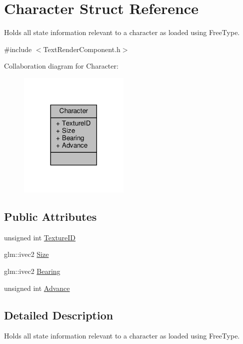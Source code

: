 \hypertarget{structCharacter}{}\section{Character Struct Reference}
\label{structCharacter}


Holds all state information relevant to a character as loaded using Free\+Type.  




{\ttfamily \#include $<$Text\+Render\+Component.\+h$>$}



Collaboration diagram for Character\+:
\nopagebreak
\begin{figure}[H]
\begin{center}
\leavevmode
\includegraphics[width=149pt]{structCharacter__coll__graph}
\end{center}
\end{figure}
\subsection*{Public Attributes}
\begin{DoxyCompactItemize}
\item 
unsigned int \hyperlink{structCharacter_a411760a6a33f2cb54dd6a0138e038a46}{Texture\+ID}
\item 
glm\+::ivec2 \hyperlink{structCharacter_aaaa598050e0ef590fe6903fd2bab40b8}{Size}
\item 
glm\+::ivec2 \hyperlink{structCharacter_afef98bf9c7f5313d96476f6f3f85f872}{Bearing}
\item 
unsigned int \hyperlink{structCharacter_a5338c0800545802a63f8e4945573cbe7}{Advance}
\end{DoxyCompactItemize}


\subsection{Detailed Description}
Holds all state information relevant to a character as loaded using Free\+Type. 

